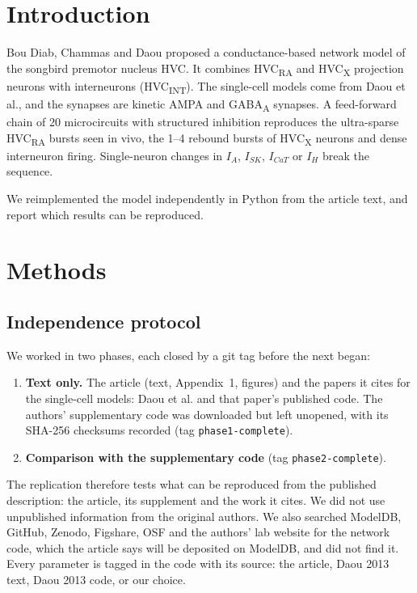 
\section*{Introduction}

Bou Diab, Chammas and Daou\supercite{BouDiab2025} proposed a conductance-based network model of
the songbird premotor nucleus HVC. It combines HVC\textsubscript{RA} and HVC\textsubscript{X}
projection neurons with interneurons (HVC\textsubscript{INT}). The single-cell models come from
Daou et al.\supercite{Daou2013}, and the synapses are kinetic AMPA and GABA\textsubscript{A}
synapses\supercite{Destexhe1994}. A feed-forward chain of 20 microcircuits with structured
inhibition reproduces the ultra-sparse HVC\textsubscript{RA} bursts seen in
vivo\supercite{Hahnloser2002}, the 1--4 rebound bursts of HVC\textsubscript{X}
neurons\supercite{Kozhevnikov2007} and dense interneuron firing. Single-neuron changes in $I_A$,
$I_{SK}$, $I_{CaT}$ or $I_H$ break the sequence.

We reimplemented the model independently in Python from the article text, and report which
results can be reproduced.

\section*{Methods}

\subsection*{Independence protocol}
We worked in two phases, each closed by a git tag before the next began:
\begin{enumerate}
\item \textbf{Text only.} The article (text, Appendix~1, figures) and the papers it cites for the
  single-cell models: Daou et al.\supercite{Daou2013} and that paper's published code. The
  authors' supplementary code was downloaded but left unopened, with its SHA-256 checksums
  recorded (tag \texttt{phase1-complete}).
\item \textbf{Comparison with the supplementary code} (tag \texttt{phase2-complete}).
\end{enumerate}
The replication therefore tests what can be reproduced from the published description: the
article, its supplement and the work it cites. We did not use unpublished information from the
original authors. We also searched ModelDB, GitHub, Zenodo, Figshare, OSF and the authors' lab
website for the network code, which the article says will be deposited on ModelDB, and did not
find it.
Every parameter is tagged in the code with its source: the article, Daou 2013 text, Daou 2013
code, or our choice.

